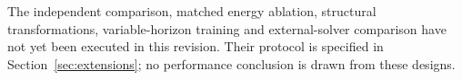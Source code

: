 The independent comparison, matched energy ablation, structural transformations, variable-horizon training and external-solver comparison have not yet been executed in this revision. Their protocol is specified in Section~\ref{sec:extensions}; no performance conclusion is drawn from these designs.
